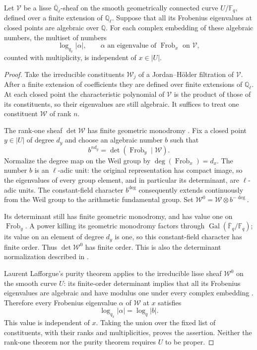 \begin{lemma}\label{glob:twist-purity}
Let $\mathcal V$ be a lisse $\overline{\mathbb Q}_\ell$-sheaf on the
smooth geometrically connected curve $U/\mathbb F_q$, defined over a
finite extension of $\mathbb Q_\ell$.  Suppose that all its Frobenius
eigenvalues at closed points are algebraic over $\mathbb Q$.
For each complex embedding of these algebraic numbers, the multiset
of numbers
\[
       \log_{q_x}|\alpha|,
       \qquad \alpha\text{ an eigenvalue of }
                        \operatorname{Frob}_x\text{ on }\mathcal V,
\]
counted with multiplicity, is independent of $x\in|U|$.
\end{lemma}

\begin{proof}
Take the irreducible constituents $\mathcal W_j$ of a
Jordan--H\"older filtration of $\mathcal V$.  After a finite extension
of coefficients they are defined over finite extensions of
$\mathbb Q_\ell$.  At each closed point the characteristic polynomial
of $\mathcal V$ is the product of those of its constituents, so their
eigenvalues are still algebraic.  It suffices to treat one constituent
$\mathcal W$ of rank $n$.

The rank-one sheaf $\det\mathcal W$ has finite geometric monodromy
\cite[Proposition~1.3.4]{DeligneII}.  Fix a closed point $y\in|U|$
of degree $d_y$ and choose an algebraic number $b$ such that
\[
                b^{n d_y}
                   =\det(\operatorname{Frob}_y\mid\mathcal W).
\]
Normalize the degree map on the Weil group by
$\deg(\operatorname{Frob}_x)=d_x$.  The number $b$ is an
$\ell$-adic unit: the original representation has compact image,
so the eigenvalues of every group element, and in particular its
determinant, are $\ell$-adic units.  The constant-field character
$b^{\deg}$ consequently extends continuously from the Weil group
to the arithmetic fundamental group.  Set
$\mathcal W^0=\mathcal W\otimes b^{-\deg}$.

Its determinant still has finite geometric monodromy, and has value
one on $\operatorname{Frob}_y$.  A power killing its geometric
monodromy factors through $\operatorname{Gal}(\overline{\mathbb F}_q/
\mathbb F_q)$; its value on an element of degree $d_y$ is one, so this
constant-field character has finite order.  Thus
$\det\mathcal W^0$ has finite order.  This is also the determinant
normalization described in \cite[Section~1.3.6]{DeligneII}.

Laurent Lafforgue's purity theorem applies to the irreducible lisse
sheaf $\mathcal W^0$ on the smooth curve $U$: its finite-order
determinant implies that all its Frobenius eigenvalues are algebraic
and have modulus one under every complex embedding
\cite[Theorem~VII.6\textup{(i)--(ii)}]{LLafforgue}.  Therefore every
Frobenius eigenvalue $\alpha$ of $\mathcal W$ at $x$ satisfies
\[
            \log_{q_x}|\alpha|=\log_q|b|.
\]
This value is independent of $x$.  Taking the union over the fixed
list of constituents, with their ranks and multiplicities, proves
the assertion.  Neither the rank-one theorem nor the purity theorem
requires $U$ to be proper.
\end{proof}

